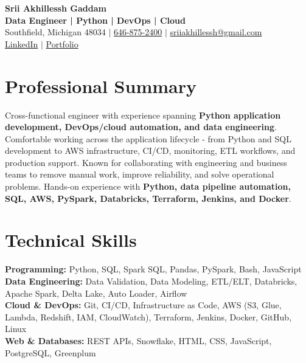 \documentclass[letterpaper,10pt]{article}
\begin{document}
\fontsize{9.35pt}{10.45pt}\selectfont

\begin{center}
    {\LARGE \textbf{Srii Akhillessh Gaddam}} \\[-1pt]
    \textbf{Data Engineer | Python | DevOps | Cloud} \\[2pt]
    Southfield, Michigan 48034 $|$
    \href{tel:6468752400}{646-875-2400} $|$
    \href{mailto:sriiakhillessh@gmail.com}{sriiakhillessh@gmail.com} \\[1pt]
    \href{https://www.linkedin.com/in/srii-akhiilessh-gaddam-b48668191/}{LinkedIn} $|$
    \href{https://sriiakhillesshg.github.io/portfolio/}{Portfolio}
\end{center}
\vspace{-8pt}

\section{Professional Summary}
\small{Cross-functional engineer with experience spanning \textbf{Python application development, DevOps/cloud automation, and data engineering}. Comfortable working across the application lifecycle - from Python and SQL development to AWS infrastructure, CI/CD, monitoring, ETL workflows, and production support. Known for collaborating with engineering and business teams to remove manual work, improve reliability, and solve operational problems. Hands-on experience with \textbf{Python, data pipeline automation, SQL, AWS, PySpark, Databricks, Terraform, Jenkins, and Docker}.}

\section{Technical Skills}
\small{
\textbf{Programming:} Python, SQL, Spark SQL, Pandas, PySpark, Bash, JavaScript \\
\textbf{Data Engineering:} Data Validation, Data Modeling, ETL/ELT, Databricks, Apache Spark, Delta Lake, Auto Loader, Airflow \\
\textbf{Cloud \& DevOps:} Git, CI/CD, Infrastructure as Code, AWS (S3, Glue, Lambda, Redshift, IAM, CloudWatch), Terraform, Jenkins, Docker, GitHub, Linux \\
\textbf{Web \& Databases:} REST APIs, Snowflake, HTML, CSS, JavaScript, PostgreSQL, Greenplum
}
\end{document}

